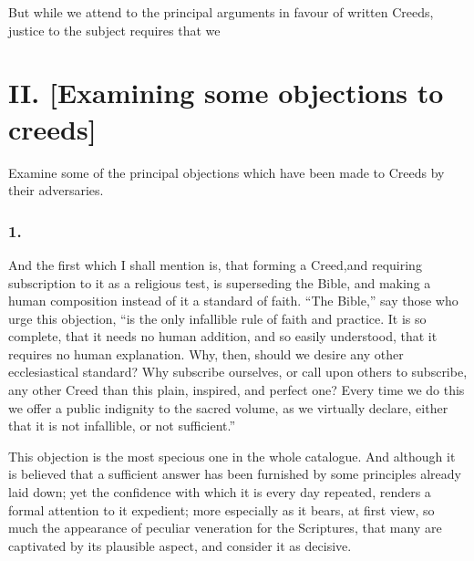 \documentclass[
]{book}
\begin{document}
But while we attend to the principal arguments in favour of written Creeds, justice to the subject requires that we

\hypertarget{ii.-examining-some-objections-to-creeds}{%
\section*{II. {[}Examining some objections to creeds{]}}\label{ii.-examining-some-objections-to-creeds}}

Examine some of the principal objections which have been made to Creeds by their adversaries.

\hypertarget{section-7}{%
\subsubsection*{1.}\label{section-7}}

And the first which I shall mention is, that forming a Creed,and requiring subscription to it as a religious test, is superseding the Bible, and making a human composition instead of it a standard of faith. ``The Bible,'' say those who urge this objection, ``is the only infallible rule of faith and practice. It is so complete, that it needs no human addition, and so easily understood, that it requires no human explanation. Why, then, should we desire any other ecclesiastical standard? Why subscribe ourselves, or call upon others to subscribe, any other Creed than this plain, inspired, and perfect one? Every time we do this we offer a public indignity to the sacred volume, as we virtually declare, either that it is not infallible, or not sufficient.''

This objection is the most specious one in the whole catalogue. And although it is believed that a sufficient answer has been furnished by some principles already laid down; yet the confidence with which it is every day repeated, renders a formal attention to it expedient; more especially as it bears, at first view, so much the appearance of peculiar veneration for the Scriptures, that many are captivated by its plausible aspect, and consider it as decisive.
\end{document}
